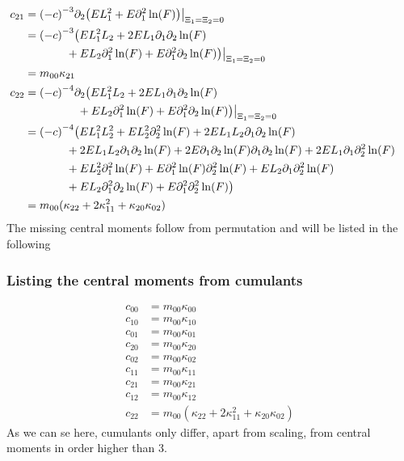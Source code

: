 \documentclass{article}
\begin{document}
\begin{align*}
  &\begin{aligned}
  \nonumber
    \mathllap{c_{21}} & = {(-c)}^{-3} \partial_2 \big(EL_1^2 + E \partial_1^2\ln(F)\big)  \bigr|_{\Xi_1=\Xi_2 = 0} \\
    & = {(-c)}^{-3} \big( E L_1^2 L_2 + 2EL_1\partial_1\partial_2\ln(F) \\
      &\qquad\quad\ \ + EL_2 \partial_1^2\ln(F) + E \partial_1^2\partial_2\ln(F) \big)  \bigr|_{\Xi_1=\Xi_2 = 0} \\
    & = m_{00}\kappa_{21}
  \end{aligned}\\
  &\begin{aligned}
  \nonumber
    \mathllap{c_{22}} & = {(-c)}^{-4} \partial_2 \big( E L_1^2 L_2 + 2EL_1\partial_1\partial_2\ln(F) \\
      &\qquad\qquad\ \ + EL_2 \partial_1^2\ln(F) + E \partial_1^2\partial_2\ln(F) \big)  \bigr|_{\Xi_1=\Xi_2 = 0} \\
    & = {(-c)}^{-4} \big(
      E L_1^2 L_2^2 + E L_2^2 \partial_2^2\ln(F) + 2 E L_1 L_2 \partial_1\partial_2 \ln(F) \\
    & \qquad\quad\ \ +
      2 E L_1 L_2 \partial_1\partial_2 \ln(F) + 2 E \partial_1\partial_2 \ln(F) \partial_1\partial_2 \ln(F) + 2 E L_1 \partial_1\partial_2^2 \ln(F) \\
    & \qquad\quad\ \ +
      E L_2^2 \partial_1^2 \ln(F) + E \partial_1^2 \ln(F) \partial_2^2 \ln(F) + E L_2 \partial_1\partial_2^2 \ln(F) \\
    & \qquad\quad\ \ +
      E L_2 \partial_1^2 \partial_2 \ln(F) + E\partial_1^2\partial_2^2 \ln(F)
      \big) \\
    & = m_{00}(\kappa_{22} + 2\kappa_{11}^2 + \kappa_{20}\kappa_{02})
  \end{aligned}
\end{align*}
The missing central moments follow from permutation and will be listed in the following

\subsubsection{Listing the central moments from cumulants}
\label{subs:Listing the central moments from cumulants}

\begin{align}
  \label{eq:all central moments from cumulants}
  c_{00} & = m_{00}\kappa_{00} \\
  c_{10} & = m_{00}\kappa_{10} \\
  c_{01} & = m_{00}\kappa_{01} \\
  c_{20} & = m_{00}\kappa_{20} \\
  c_{02} & = m_{00}\kappa_{02} \\
  c_{11} & = m_{00}\kappa_{11} \\
  c_{21} & = m_{00}\kappa_{21} \\
  c_{12} & = m_{00}\kappa_{12} \\
  c_{22} & = m_{00}(\kappa_{22} + 2\kappa_{11}^2 + \kappa_{20}\kappa_{02})
\end{align}
As we can se here, cumulants only differ, apart from scaling, from central moments in order higher than $3$.
\end{document}
